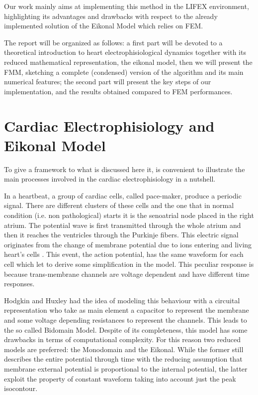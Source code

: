 \documentclass[11pt,a4paper]{article}
\begin{document}
    Our work mainly aims at implementing this method in the LIFEX environment, highlighting its advantages and drawbacks with respect to the already implemented solution of the Eikonal Model which relies on FEM.

    The report will be organized as follows: a first part will be devoted to a theoretical introduction to heart electrophisiological dynamics together with its reduced mathematical representation, the eikonal model, then we will present the FMM, sketching a complete (condensed) version of the algorithm and its main numerical features; the second part will present the key steps of our implementation, and the results obtained compared to FEM performances.

    \section{Cardiac Electrophisiology and Eikonal Model} \label{sec:Eikonal}

    To give a framework to what is discussed here it, is convenient to illustrate the main processes involved in the cardiac electrophisiology in a nutshell.

    In a heartbeat, a group of cardiac cells, called pace-maker, produce a periodic signal. There are different clusters of these cells and the one that in normal condition (i.e. non pathological) starts it is the senoatrial node placed in the right atrium. The potential wave is first transmitted through the whole atrium and then it reaches the ventricles through the Purkinje fibers. This electric signal originates from the change of membrane potential due to ions entering and living heart's cells . This event, the action potential, has the same waveform for each cell which let to derive some simplification in the model. This peculiar response is because trans-membrane channels are voltage dependent and have different time responses.

    Hodgkin and Huxley had the idea of modeling this behaviour with a circuital representation who take as main element a capacitor to represent the membrane and some voltage depending resistances to represent the channels. This leads to the so called Bidomain Model. Despite of its completeness, this model has some drawbacks in terms of computational complexity. For this reason two reduced models are preferred: the Monodomain and the Eikonal. While the former still describes the entire potential through time with the reducing assumption that membrane external potential is proportional to the internal potential, the latter exploit the property of constant waveform taking into account just the peak isocontour.
\end{document}
